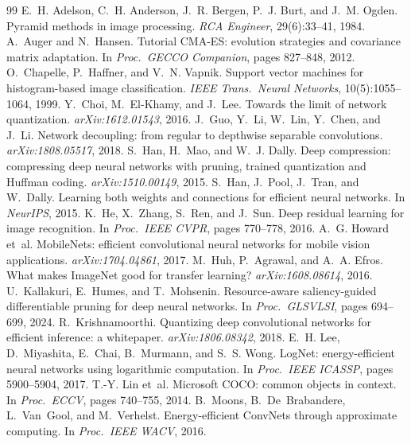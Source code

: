 \documentclass[10pt,twocolumn,a4paper]{article}
\begin{document}
\begin{thebibliography}{99}\small
{} E.~H. Adelson, C.~H. Anderson, J.~R. Bergen, P.~J. Burt, and J.~M. Ogden. Pyramid methods in image processing. \emph{RCA Engineer}, 29(6):33--41, 1984.
 A.~Auger and N.~Hansen. Tutorial CMA-ES: evolution strategies and covariance matrix adaptation. In \emph{Proc.\ GECCO Companion}, pages 827--848, 2012.
 O.~Chapelle, P.~Haffner, and V.~N. Vapnik. Support vector machines for histogram-based image classification. \emph{IEEE Trans.\ Neural Networks}, 10(5):1055--1064, 1999.
 Y.~Choi, M.~El-Khamy, and J.~Lee. Towards the limit of network quantization. \emph{arXiv:1612.01543}, 2016.
 J.~Guo, Y.~Li, W.~Lin, Y.~Chen, and J.~Li. Network decoupling: from regular to depthwise separable convolutions. \emph{arXiv:1808.05517}, 2018.
 S.~Han, H.~Mao, and W.~J. Dally. Deep compression: compressing deep neural networks with pruning, trained quantization and Huffman coding. \emph{arXiv:1510.00149}, 2015.
 S.~Han, J.~Pool, J.~Tran, and W.~Dally. Learning both weights and connections for efficient neural networks. In \emph{NeurIPS}, 2015.
 K.~He, X.~Zhang, S.~Ren, and J.~Sun. Deep residual learning for image recognition. In \emph{Proc.\ IEEE CVPR}, pages 770--778, 2016.
 A.~G. Howard et~al. MobileNets: efficient convolutional neural networks for mobile vision applications. \emph{arXiv:1704.04861}, 2017.
 M.~Huh, P.~Agrawal, and A.~A. Efros. What makes ImageNet good for transfer learning? \emph{arXiv:1608.08614}, 2016.
 U.~Kallakuri, E.~Humes, and T.~Mohsenin. Resource-aware saliency-guided differentiable pruning for deep neural networks. In \emph{Proc.\ GLSVLSI}, pages 694--699, 2024.
 R.~Krishnamoorthi. Quantizing deep convolutional networks for efficient inference: a whitepaper. \emph{arXiv:1806.08342}, 2018.
 E.~H. Lee, D.~Miyashita, E.~Chai, B.~Murmann, and S.~S. Wong. LogNet: energy-efficient neural networks using logarithmic computation. In \emph{Proc.\ IEEE ICASSP}, pages 5900--5904, 2017.
 T.-Y. Lin et~al. Microsoft COCO: common objects in context. In \emph{Proc.\ ECCV}, pages 740--755, 2014.
 B.~Moons, B.~De~Brabandere, L.~Van~Gool, and M.~Verhelst. Energy-efficient ConvNets through approximate computing. In \emph{Proc.\ IEEE WACV}, 2016.

\end{thebibliography}
\end{document}

